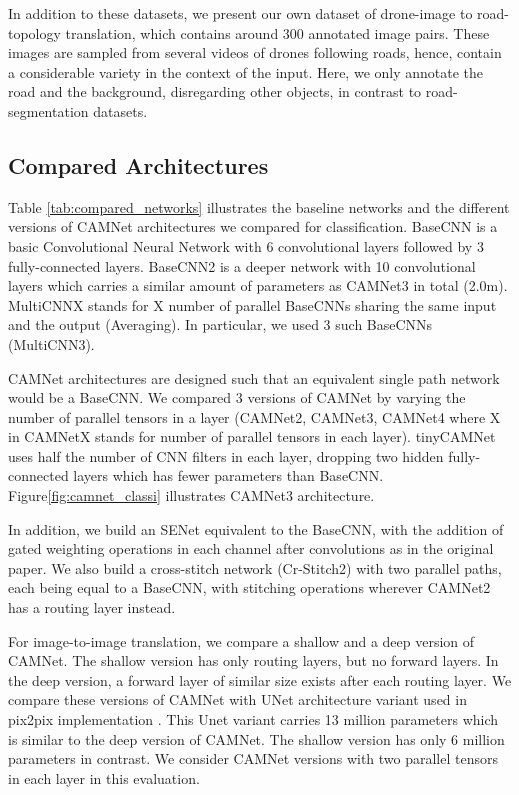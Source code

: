 \documentclass[10pt,twocolumn,letterpaper]{article}
\begin{document}
In addition to these datasets, we present our own dataset of drone-image to road-topology translation, which contains around 300 annotated image pairs. These images are sampled from several videos of drones following roads, hence, contain a considerable variety in the context of the input. 
Here, we only annotate the road and the background, disregarding other objects, in contrast to road-segmentation datasets.


\subsection{Compared Architectures}
\label{ss:compared_archi}
\vspace{-0.05in}
Table \ref{tab:compared_networks} illustrates the baseline networks and the different versions of CAMNet architectures we compared for classification. BaseCNN is a basic Convolutional Neural Network with 6 convolutional layers followed by 3 fully-connected layers. BaseCNN2 is a deeper network with 10 convolutional layers which carries a similar amount of parameters as CAMNet3 in total (2.0m). MultiCNNX stands for X number of parallel BaseCNNs sharing the same input and the output (Averaging). In particular, we used 3 such BaseCNNs (MultiCNN3).

CAMNet architectures are designed such that an equivalent single path network would be a BaseCNN. We compared 3 versions of CAMNet by varying the number of parallel tensors in a layer (CAMNet2, CAMNet3, CAMNet4 where X in CAMNetX stands for number of parallel tensors in each layer). tinyCAMNet uses half the number of CNN filters in each layer, dropping two hidden fully-connected layers which has fewer parameters than BaseCNN.  Figure\ref{fig:camnet_classi} illustrates CAMNet3 architecture.

In addition, we build an SENet \cite{hu2017squeeze} equivalent to the BaseCNN, with the addition of gated weighting operations in each channel after convolutions as in the original paper. We also build a cross-stitch network (Cr-Stitch2) \cite{cross_stich} with two parallel paths, each being equal to a BaseCNN, with stitching operations wherever CAMNet2 has a routing layer instead. 

For image-to-image translation, we compare a shallow and a deep version of CAMNet. The shallow version has only routing layers, but no forward layers. In the deep version, a forward layer of similar size exists after each routing layer. We compare these versions of CAMNet with UNet architecture \cite{ronneberger2015unet} variant used in pix2pix implementation \cite{isola2017image}. This Unet variant carries 13 million parameters which is similar to the deep version of CAMNet. The shallow version has only 6 million parameters in contrast. We consider CAMNet versions with two parallel tensors in each layer in this evaluation.
\end{document}
